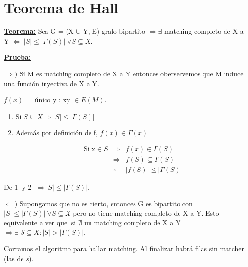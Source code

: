 \documentclass[12pt,a4paper]{report}
\begin{document}
	\section{Teorema de Hall}

		\textbf{\underline{Teorema:}} Sea G = (X $\cup$ Y, E) grafo bipartito $\Rightarrow \exists$ matching completo de X a Y $\Leftrightarrow \; \lvert S \rvert \leq \lvert \Gamma(S) \rvert \; \forall S \subseteq X$.

		\vspace{3mm}
		\textbf{\underline{Prueba:}}

			$\Rightarrow)$ Si M es matching completo de X a Y entonces oberservemos que M induce una función inyectiva de X a Y.

			\begin{center}
				$f(x) = $ único y : xy $\in E(M)$.
			\end{center}

			\begin{enumerate}
				\item Si $S \subseteq X \Rightarrow \lvert S \rvert \leq \lvert \Gamma(S) \rvert$


				\item Además por definición de f, $f(x) \in \Gamma(x)$

				\begin{eqnarray}
					\nonumber \text{Si x} \in S & \Rightarrow & f(x) \in \Gamma(S) \\
					\nonumber & \Rightarrow & f(S) \subseteq \Gamma(S) \\
					\nonumber &\therefore & \lvert f(S) \rvert \leq \lvert \Gamma(S) \rvert
				\end{eqnarray}

			\end{enumerate}

			De \textcircled{1} y \textcircled{2} $\Rightarrow \lvert S \rvert \leq \lvert \Gamma(S) \rvert$.

			\vspace{5mm}
			$\Leftarrow)$ Supongamos que no es cierto, entonces G es bipartito con $\lvert S \rvert \leq \lvert \Gamma(S) \rvert \; \forall S \subseteq X$ pero no tiene matching completo de X a Y. Esto equivalente a ver que: si $\nexists$ un matching completo de X a Y $\Rightarrow \exists \; S \subseteq X : \lvert S \rvert > \lvert \Gamma(S) \rvert$.

			\vspace{5 mm}
			Corramos el algoritmo para hallar matching. Al finalizar habrá filas sin matcher (las de \textit{s}).
\end{document}
